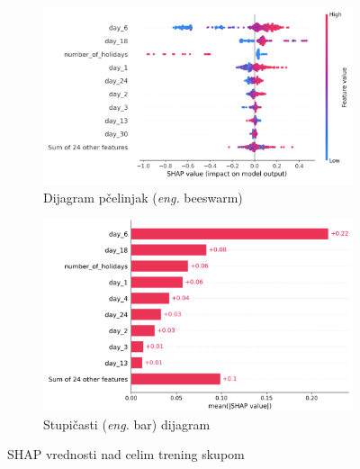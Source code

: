 \documentclass[12pt,oneside]{memoir}
\begin{document}
\begin{figure}[!htb]
    \centering
    \begin{subfigure}{.5\textwidth}
      \centering
      \includegraphics[width=1\linewidth]{./grafici/shap_xgboost_dnevni.png}
      \caption{Dijagram pčelinjak (\textit{eng.} beeswarm)}
      \label{fig: shap_beeswarm}
    \end{subfigure}%
    \begin{subfigure}{.5\textwidth}
      \centering
      \includegraphics[width=1\linewidth]{./grafici/shap_xgboost_dnevni_bar.png}
      \caption{Stupičasti (\textit{eng.} bar) dijagram}
      \label{fig: shap_bar}
    \end{subfigure}
    \caption{SHAP vrednosti nad celim trening skupom}
    \label{fig: shap_xgboost}
\end{figure}
\end{document}

